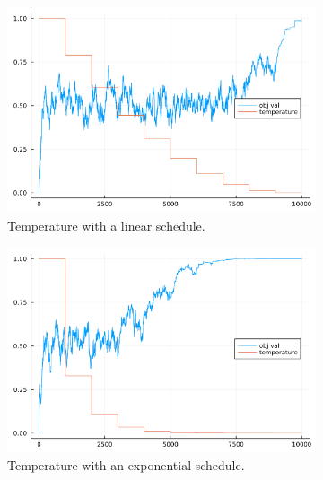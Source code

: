\documentclass[]{article}
\theoremstyle{definition}
\begin{document}
        \begin{figure}[H]
            \centering
            \begin{subfigure}{0.3\textwidth}
                \includegraphics[width=\textwidth]{sa_experiment1.png}
                \caption{Temperature with a linear schedule. }
            \end{subfigure}
            \hfill
            \begin{subfigure}{0.3\textwidth}
                \includegraphics[width=\textwidth]{sa_experiment2.png}
                \caption{Temperature with an exponential schedule. }
            \end{subfigure}
            \hfill
            \begin{subfigure}{0.3\textwidth}

\end{subfigure}
\end{figure}
\end{document}
